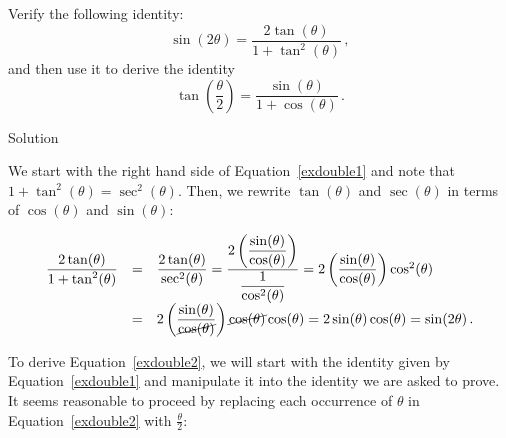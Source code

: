 



\ifvc
\begin{example}
Verify the following identity:  
\begin{equation}
\sin(2\theta) = \dfrac{2\tan(\theta)}{1 + \tan^{2}(\theta)}\,,
\label{exdouble1}
\end{equation}
and then use it to derive the identity
\begin{equation}
\tan\left(\dfrac{\theta}{2}\right) = \dfrac{\sin(\theta)}{1+\cos(\theta)}\,.
\label{exdouble2}
\end{equation}

Solution 

 We start with the right hand side of Equation~\eqref{exdouble1} and note that $1 + \tan^{2}(\theta) = \sec^{2}(\theta)$.  Then, we rewrite $\tan(\theta)$ and $\sec(\theta)$ in terms of $\cos(\theta)$ and $\sin(\theta)$:

\vspace{-.15in}

\[ \begin{array}{rcl}

\dfrac{2\tan(\theta)}{1 + \tan^{2}(\theta)} & = & \dfrac{2\tan(\theta)}{\sec^{2}(\theta)}= \dfrac{2 \left( \dfrac{\sin(\theta)}{\cos(\theta)}\right)}{\dfrac{1}{\cos^{2}(\theta)}}= 2\left( \dfrac{\sin(\theta)}{\cos(\theta)}\right) \cos^{2}(\theta) \\ [15pt]
																						& = & 2\left( \dfrac{\sin(\theta)}{\cancel{\cos(\theta)}}\right) \cancel{\cos(\theta)} \cos(\theta) = 2\sin(\theta) \cos(\theta) = \sin(2\theta)\,. \\ 

\end{array} \]


To derive Equation~\eqref{exdouble2}, we will start with the identity given by Equation~\eqref{exdouble1}  and manipulate it into the identity we are asked to prove.  It seems reasonable to proceed by replacing each occurrence of $\theta$ in Equation~\eqref{exdouble2} with $\frac{\theta}{2}$:

\vspace{-.1in}

\[ \begin{array}{rrcl} 


\end{array}\]
\end{example}
